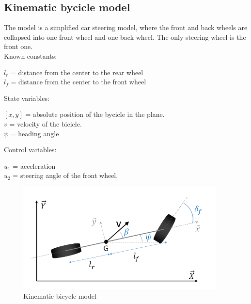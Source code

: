 \documentclass[12pt]{article}
\begin{document}
\subsection{Kinematic bycicle model \cite{kbm}}
The model is a simplified car steering model, where the front and back wheels are collapsed into one front wheel and one back wheel. The only steering wheel is the front one. \\
\smallskip
Known constants:
\begin{center}
\( l_r \) = distance from the center to the rear wheel \\
\( l_f \) = distance from the center to the front wheel \\
\end{center}
State variables:
\begin{center}
\( [x, y] \) = absolute position of the bycicle in the plane. \\
\( v \) = velocity of the bicicle. \\
\( \psi \) = heading angle \\
\end{center}
Control variables:
\begin{center}
\( u_1 \) = acceleration \\
\( u_2 \) = steering angle of the front wheel. \\
\end{center}
\begin{figure}[!h]
\includegraphics[width=\textwidth]{bike}
\caption{Kinematic bicycle model}
\end{figure}
\smallskip

\clearpage
\end{document}
